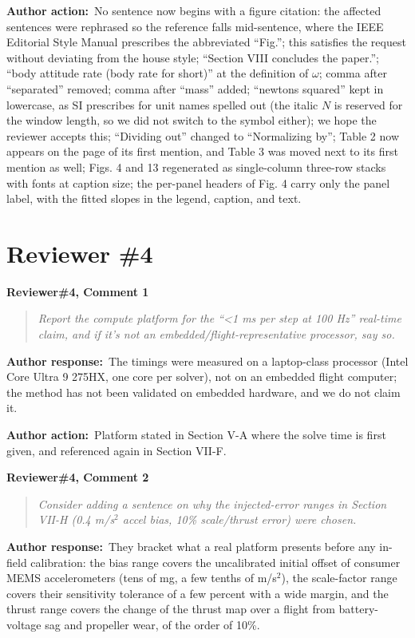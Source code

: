\documentclass[11pt]{article}
\newcommand{\concern}[1]{\par\medskip\noindent\colorbox{gray!12}{\parbox{\dimexpr\linewidth-2\fboxsep}{\textbf{#1}}}\par\smallskip}
\newcommand{\rlabel}[1]{\par\textbf{#1}\ }
\begin{document}
\rlabel{Author action:}No sentence now begins with a figure citation: the affected sentences were rephrased so the reference falls mid-sentence, where the IEEE Editorial Style Manual prescribes the abbreviated ``Fig.''; this satisfies the request without deviating from the house style; ``Section VIII concludes the paper.''; ``body attitude rate (body rate for short)'' at the definition of $\omega$; comma after ``separated'' removed; comma after ``mass'' added; ``newtons squared'' kept in lowercase, as SI prescribes for unit names spelled out (the italic $N$ is reserved for the window length, so we did not switch to the symbol either); we hope the reviewer accepts this; ``Dividing out'' changed to ``Normalizing by''; Table 2 now appears on the page of its first mention, and Table 3 was moved next to its first mention as well; Figs. 4 and 13 regenerated as single-column three-row stacks with fonts at caption size; the per-panel headers of Fig. 4 carry only the panel label, with the fitted slopes in the legend, caption, and text.

\section*{Reviewer \#4}

\concern{Reviewer\#4, Comment 1}

\begin{quote}\itshape Report the compute platform for the ``<1 ms per step at 100 Hz'' real-time claim, and if it's not an embedded/flight-representative processor, say so.\end{quote}

\rlabel{Author response:}The timings were measured on a laptop-class processor (Intel Core Ultra 9 275HX, one core per solver), not on an embedded flight computer; the method has not been validated on embedded hardware, and we do not claim it.

\rlabel{Author action:}Platform stated in Section V-A where the solve time is first given, and referenced again in Section VII-F.

\concern{Reviewer\#4, Comment 2}

\begin{quote}\itshape Consider adding a sentence on why the injected-error ranges in Section VII-H (0.4 m/s$^2$ accel bias, 10\% scale/thrust error) were chosen.\end{quote}

\rlabel{Author response:}They bracket what a real platform presents before any in-field calibration: the bias range covers the uncalibrated initial offset of consumer MEMS accelerometers (tens of mg, a few tenths of m/s$^2$), the scale-factor range covers their sensitivity tolerance of a few percent with a wide margin, and the thrust range covers the change of the thrust map over a flight from battery-voltage sag and propeller wear, of the order of 10\%.
\end{document}
